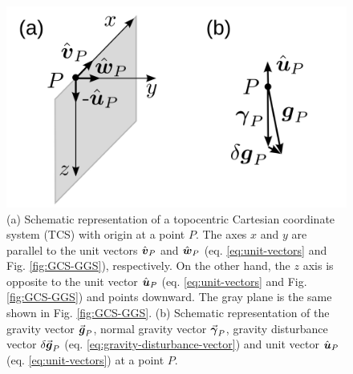 \documentclass[extra]{gji}
\newcommand{\versor}[1]{\hat{\mitbf{#1}}}
\renewcommand{\vector}[1]{\vec{\mitbf{#1}}}
\begin{document}
\begin{figure}
    \includegraphics{figures/local-system.png}
    \caption{(a) Schematic representation of a topocentric Cartesian
    coordinate system (TCS) with origin at a point $P$. The axes $x$
    and $y$ are parallel to the unit vectors $\versor{v}_{P}$
    and $\versor{w}_{P}$ (eq. \ref{eq:unit-vectors} and
    Fig. \ref{fig:GCS-GGS}), respectively. On the other hand, the $z$ axis is opposite to the unit vector $\versor{u}_{P}$ (eq.
    \ref{eq:unit-vectors} and Fig. \ref{fig:GCS-GGS}) and points downward. The gray plane is the same shown in Fig. \ref{fig:GCS-GGS}.
    (b) Schematic representation of the gravity vector
    $\vector{g}_{P}$, normal gravity vector $\vector{\gamma}_{P}$,
    gravity disturbance vector $\delta \vector{g}_{P}$
    (eq. \ref{eq:gravity-disturbance-vector}) and unit vector
    $\versor{u}_{P}$ (eq. \ref{eq:unit-vectors}) at a point
    $P$.}
  \label{fig:TCS}
\end{figure}
\end{document}
